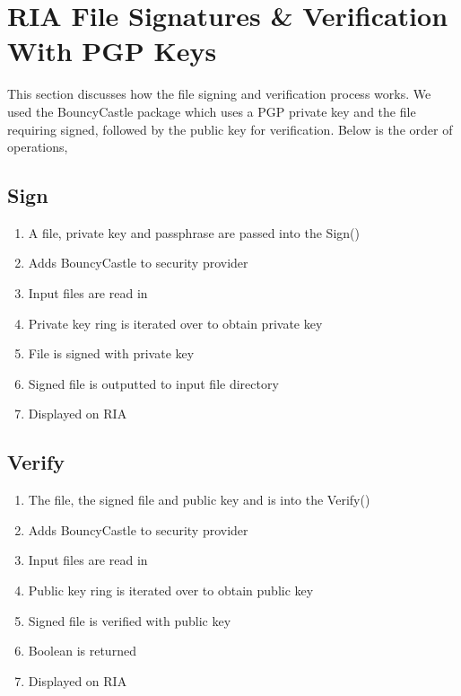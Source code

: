 \section{RIA File Signatures \& Verification With PGP Keys}

This section discusses how the file signing and verification process works. We used the BouncyCastle package which uses a PGP private key and the file requiring signed, followed by the public key for verification. Below is the order of operations,

\subsection{Sign}
\begin{enumerate}
    \item A file, private key and passphrase are passed into the Sign()
    \item Adds BouncyCastle to security provider
    \item Input files are read in
    \item Private key ring is iterated over to obtain private key
    \item File is signed with private key
    \item Signed file is outputted to input file directory
    \item Displayed on RIA
\end{enumerate}


\subsection{Verify}
\begin{enumerate}
    \item The file, the signed file and public key and is into the Verify()
    \item Adds BouncyCastle to security provider
    \item Input files are read in
    \item Public key ring is iterated over to obtain public key
    \item Signed file is verified with public key
    \item Boolean is returned
    \item Displayed on RIA
\end{enumerate}